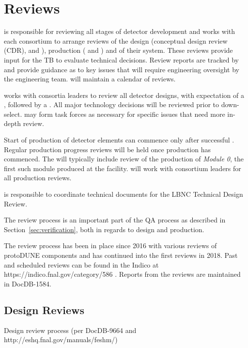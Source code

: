 \chapter{Reviews}
\label{vl:tc-review}

 is responsible for reviewing all stages of detector
development and works with each consortium to arrange reviews of the
design (conceptual design review (CDR),  and ),
production ( and ) and  of their
system.  These reviews provide input for the TB to evaluate technical
decisions.  Review reports are tracked by  and provide
guidance as to key issues that will require engineering oversight by
the  engineering team.  will maintain a calendar
of  reviews.

 works with consortia leaders to review all detector designs,
with expectation of a , followed by a .  All
major technology decisions will be reviewed prior to down-select.  
may form task forces as necessary for specific issues that need more
in-depth review.


Start of production of detector elements can commence only after
successful . Regular production progress
reviews will be held once production has commenced. The 
will typically include review of the production of \textit{Module 0}, the
first such module produced at the facility.  will work with
consortium leaders for all production reviews.

 is responsible to coordinate technical documents for the LBNC
Technical Design Review.

The review process is an important part of the  QA process
as described in Section~\ref{sec:verification}, both in regards to
design and production.

The review process has been in place since 2016 with various reviews
of protoDUNE components and has continued into the first 
reviews in 2018. Past and scheduled reviews can be found in the
 Indico at https://indico.fnal.gov/category/586 .
Reports from the reviews are maintained in DocDB-1584.

\section{Design Reviews}

Design review process (per DocDB-9664 and http://eshq.fnal.gov/manuals/feshm/)

